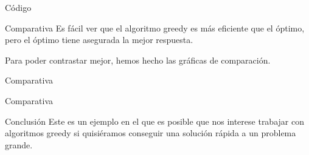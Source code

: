 \begin{frame}[fragile]{Código}
	\resizebox{10cm}{!}{
	}
\end{frame}

\begin{frame}{Comparativa}
	Es fácil ver que el algoritmo greedy es más eficiente que el óptimo, pero el óptimo tiene asegurada la mejor respuesta.
	
	Para poder contrastar mejor, hemos hecho las gráficas de comparación.
\end{frame}

\begin{frame}{Comparativa}
\end{frame}

\begin{frame}{Comparativa}
\end{frame}

\begin{frame}{Conclusión}
	Este es un ejemplo en el que es posible que nos interese trabajar con algoritmos greedy si quisiéramos conseguir una solución rápida a un problema grande.
\end{frame}


